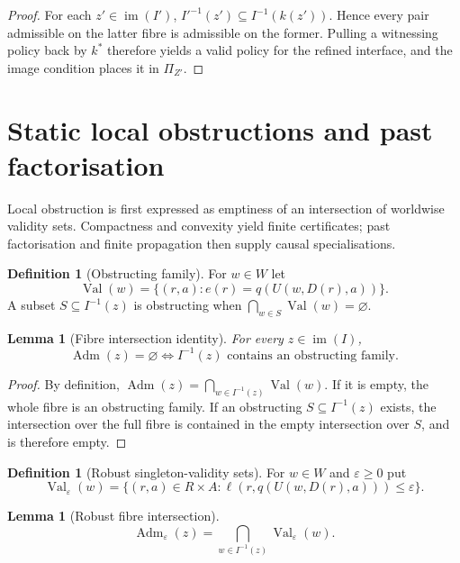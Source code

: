 \documentclass[11pt]{article}
\theoremstyle{plain}
\newtheorem{lemma}[theorem]{Lemma}
\theoremstyle{definition}
\newtheorem{definition}[theorem]{Definition}
\theoremstyle{remark}
\newcommand{\im}{\operatorname{im}}
\newcommand{\Adm}{\operatorname{Adm}}
\newcommand{\eps}{\varepsilon}
\begin{document}
\begin{proof}
For each $z'\in\im(I')$,
$I'^{-1}(z')\subseteq I^{-1}(k(z'))$. Hence every pair admissible on the latter
fibre is admissible on the former. Pulling a witnessing policy back by $k^*$
therefore yields a valid policy for the refined interface, and the image
condition places it in $\Pi_{Z'}$.
\end{proof}

\section{Static local obstructions and past factorisation}\label{sec:static-local}

Local obstruction is first expressed as emptiness of an intersection of
worldwise validity sets. Compactness and convexity yield finite certificates;
past factorisation and finite propagation then supply causal specialisations.



\begin{definition}[Obstructing family]\label{def:obfamily}
For $w\in W$ let
\[
\operatorname{Val}(w)=\{(r,a):e(r)=q(U(w,D(r),a))\}.
\]
A subset $S\subseteq I^{-1}(z)$ is obstructing when
$\bigcap_{w\in S}\operatorname{Val}(w)=\varnothing$.
\end{definition}

\begin{lemma}[Fibre intersection identity]\label{lem:Wfam}
For every $z\in\im(I)$,
\[
\Adm(z)=\varnothing
\iff
I^{-1}(z)\text{ contains an obstructing family}.
\]
\end{lemma}

\begin{proof}
By definition,
$\Adm(z)=\bigcap_{w\in I^{-1}(z)}\operatorname{Val}(w)$. If it is empty, the
whole fibre is an obstructing family. If an obstructing
$S\subseteq I^{-1}(z)$ exists, the intersection over the full fibre is contained
in the empty intersection over $S$, and is therefore empty.
\end{proof}

\begin{definition}[Robust singleton-validity sets]\label{def:valeps}
For $w\in W$ and $\eps\ge0$ put
\[
\operatorname{Val}_\eps(w)=
\{(r,a)\in R\times A:
\ell(r,q(U(w,D(r),a)))\le\eps\}.
\]
\end{definition}

\begin{lemma}[Robust fibre intersection]\label{lem:robust-intersection}
\[
\Adm_\eps(z)=
\bigcap_{w\in I^{-1}(z)}\operatorname{Val}_\eps(w).
\]
\end{lemma}
\end{document}
